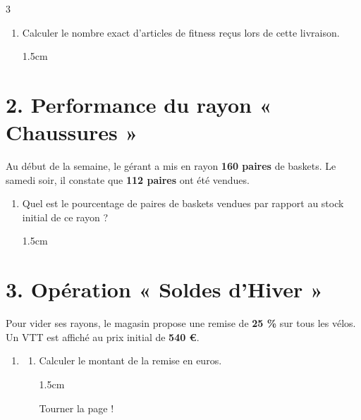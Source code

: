 \documentclass[a4paper]{book}
\begin{document}
{\begin{exerciceNote}{3}
        \begin{enumerate}[leftmargin=*]
            \item Calculer le nombre exact d'articles de fitness reçus lors de cette livraison.

            \begin{ZoneReponse}{1.5cm}                
            \end{ZoneReponse}
        \end{enumerate}
        
        \section*{2. Performance du rayon « Chaussures »}
        Au début de la semaine, le gérant a mis en rayon \textbf{160 paires} de baskets. Le samedi soir, il constate que \textbf{112 paires} ont été vendues.
        
        \begin{enumerate}[resume, leftmargin=*]
            \item Quel est le pourcentage de paires de baskets vendues par rapport au stock initial de ce rayon ?
    
            \begin{ZoneReponse}{1.5cm}                
            \end{ZoneReponse}
        \end{enumerate}
        
        \section*{3. Opération « Soldes d'Hiver »}
        Pour vider ses rayons, le magasin propose une remise de \textbf{25 \%} sur tous les vélos. Un VTT est affiché au prix initial de \textbf{540 \euro}.

        \begin{enumerate}[resume, leftmargin=*]
            \item \begin{enumerate}[label=\alph*), leftmargin=*]
                \item Calculer le montant de la remise en euros.
                
                \begin{ZoneReponse}{1.5cm}                
                \end{ZoneReponse}

\vfill
\hfill Tourner la page !


\end{enumerate}
\end{enumerate}
\end{exerciceNote}}
\end{document}
